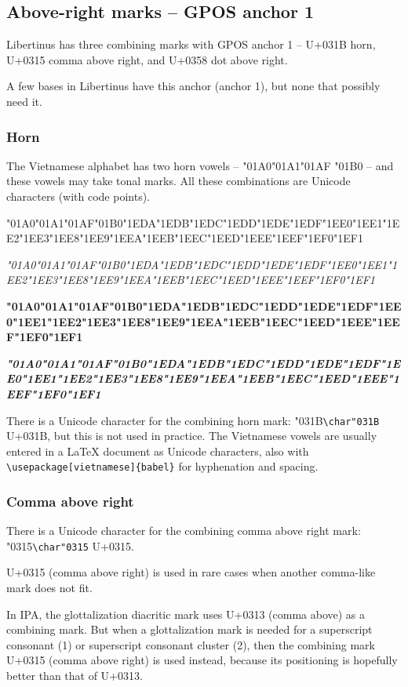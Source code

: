 \documentclass[landscape]{article}
\newcommand{\gs}{\hspace{0.5mm}}	%
\newcommand{\ribbi}[1]{#1\
	
	{\itshape #1}
	
	{\bfseries #1}
	
	{\itshape\bfseries #1}}
\begin{document}
\newpage
\subsection*{Above-right marks -- GPOS anchor 1}

Libertinus has three combining marks with GPOS anchor 1 -- 
U+031B horn, U+0315 comma above right, and U+0358 dot above right.

A few bases in Libertinus have this anchor (anchor 1), but none that possibly need it.

\subsubsection*{Horn}

The Vietnamese alphabet has two horn vowels -- \char"01A0\gs \char"01A1\gs \char"01AF \char"01B0 -- and these vowels may take tonal marks. 
All these combinations are Unicode characters (with code points).

\ribbi{ 	
	\char"01A0\gs \char"01A1\gs \char"01AF\gs \char"01B0\gs \char"1EDA\gs \char"1EDB\gs \char"1EDC\gs \char"1EDD\gs \char"1EDE\gs \char"1EDF\gs \char"1EE0\gs \char"1EE1\gs \char"1EE2\gs \char"1EE3\gs \char"1EE8\gs \char"1EE9\gs \char"1EEA\gs \char"1EEB\gs \char"1EEC\gs \char"1EED\gs \char"1EEE\gs \char"1EEF\gs \char"1EF0\gs \char"1EF1\gs
}

There is a Unicode character for the combining horn mark: 
 \char"031B\gs \verb|\char"031B| U+031B, 
but this is not used in practice.
The Vietnamese vowels are usually entered in a LaTeX document as Unicode characters, also with 
\verb|\usepackage[vietnamese]{babel}| for hyphenation and spacing.

\subsubsection*{Comma above right}

There is a Unicode character for the combining comma above right mark: 
\char"0315\gs \verb|\char"0315| U+0315.

U+0315 (comma above right) is used in rare cases when another comma-like mark does not fit.

In IPA, the glottalization diacritic mark uses U+0313 (comma above) as a combining mark.
But when a glottalization mark is needed for a superscript consonant (1) or superscript consonant cluster (2),
then the combining mark U+0315 (comma above right) is used instead, because its positioning is hopefully better than that of U+0313. 
\end{document}
